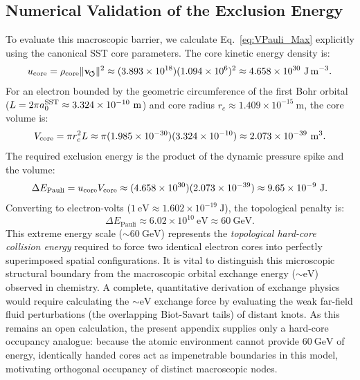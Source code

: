 \documentclass[11pt,a4paper]{article}
\newcommand{\rc}{r_c}
\newcommand{\rhocore}{\rho_{\text{core}}}
\begin{document}
    \subsection{Numerical Validation of the Exclusion Energy}
        To evaluate this macroscopic barrier, we calculate Eq.~\eqref{eq:VPauli_Max} explicitly using the canonical SST core parameters. The core kinetic energy density is:
        \begin{equation}
            u_{\rm core} = \rhocore \lVert\mathbf{v}_{\!\boldsymbol{\circlearrowleft}}\rVert^2 \approx (3.893 \times 10^{18})(1.094 \times 10^6)^2 \approx 4.658 \times 10^{30}\ \mathrm{J\,m^{-3}}.
        \end{equation}
        For an electron bounded by the geometric circumference of the first Bohr orbital ($L = 2\pi a_0^{\rm SST} \approx 3.324 \times 10^{-10}\ \mathrm{m}$) and core radius $\rc \approx 1.409 \times 10^{-15}\ \mathrm{m}$, the core volume is:
        \begin{equation}
            V_{\rm core} = \pi \rc^2 L \approx \pi (1.985 \times 10^{-30})(3.324 \times 10^{-10}) \approx 2.073 \times 10^{-39}\ \mathrm{m^3}.
        \end{equation}
        The required exclusion energy is the product of the dynamic pressure spike and the volume:
        \begin{equation}
            \label{eq:VPauli_Num}
            \Delta E_{\text{Pauli}} = u_{\rm core} V_{\rm core} \approx (4.658 \times 10^{30}) (2.073 \times 10^{-39}) \approx 9.65 \times 10^{-9}\ \mathrm{J}.
        \end{equation}
        Converting to electron-volts ($1\ \mathrm{eV} \approx 1.602 \times 10^{-19}\ \mathrm{J}$), the topological penalty is:
        \begin{equation}
            \Delta E_{\text{Pauli}} \approx 6.02 \times 10^{10}\ \mathrm{eV} \approx 60\ \mathrm{GeV}.
        \end{equation}
        This extreme energy scale ($\sim 60\ \mathrm{GeV}$) represents the \emph{topological hard-core collision energy} required to force two identical electron cores into perfectly superimposed spatial configurations. It is vital to distinguish this microscopic structural boundary from the macroscopic orbital exchange energy ($\sim \mathrm{eV}$) observed in chemistry. A complete, quantitative derivation of exchange physics would require calculating the $\sim \mathrm{eV}$ exchange force by evaluating the weak far-field fluid perturbations (the overlapping Biot-Savart tails) of distant knots. As this remains an open calculation, the present appendix supplies only a hard-core occupancy analogue: because the atomic environment cannot provide $60\ \mathrm{GeV}$ of energy, identically handed cores act as impenetrable boundaries in this model, motivating orthogonal occupancy of distinct macroscopic nodes.
    
\end{document}
